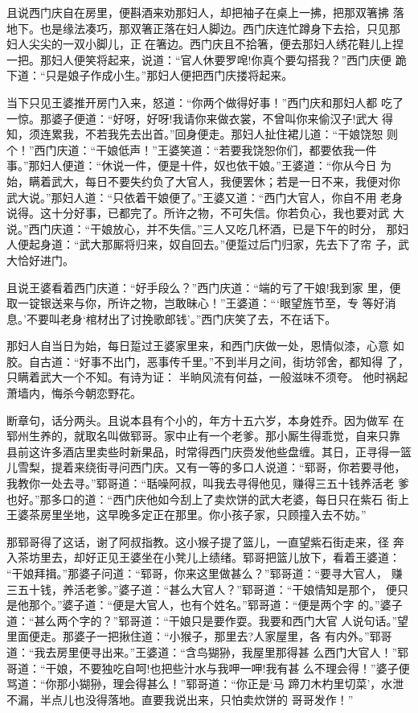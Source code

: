 且说西门庆自在房里，便斟酒来劝那妇人，却把袖子在桌上一拂，把那双箸拂
落地下。也是缘法凑巧，那双箸正落在妇人脚边。西门庆连忙蹲身下去拾，只见那
妇人尖尖的一双小脚儿，正在箸边。西门庆且不拾箸，便去那妇人绣花鞋儿上捏
一把。那妇人便笑将起来，说道：“官人休要罗唣!你真个要勾搭我？”西门庆便
跪下道：“只是娘子作成小生。”那妇人便把西门庆搂将起来。

当下只见王婆推开房门入来，怒道：“你两个做得好事！”西门庆和那妇人都
吃了一惊。那婆子便道：“好呀，好呀!我请你来做衣裳，不曾叫你来偷汉子!武大
得知，须连累我，不若我先去出首。”回身便走。那妇人扯住裙儿道：“干娘饶恕
则个！”西门庆道：“干娘低声！”王婆笑道：“若要我饶恕你们，都要依我一件
事。”那妇人便道：“休说一件，便是十件，奴也依干娘。”王婆道：“你从今日
为始，瞒着武大，每日不要失约负了大官人，我便罢休；若是一日不来，我便对你
武大说。”那妇人道：“只依着干娘便了。”王婆又道：“西门大官人，你自不用
老身说得。这十分好事，已都完了。所许之物，不可失信。你若负心，我也要对武
大说。”西门庆道：“干娘放心，并不失信。”三人又吃几杯酒，已是下午的时分，
那妇人便起身道：“武大那厮将归来，奴自回去。”便踅过后门归家，先去下了帘
子，武大恰好进门。

且说王婆看着西门庆道：“好手段么？”西门庆道：“端的亏了干娘!我到家
里，便取一锭银送来与你，所许之物，岂敢昧心！”王婆道：“‘眼望旌节至，专
等好消息。’不要叫老身‘棺材出了讨挽歌郎钱’。”西门庆笑了去，不在话下。

那妇人自当日为始，每日踅过王婆家里来，和西门庆做一处，恩情似漆，心意
如胶。自古道：“好事不出门，恶事传千里。”不到半月之间，街坊邻舍，都知得
了，只瞒着武大一个不知。有诗为证：
半晌风流有何益，一般滋味不须夸。
他时祸起萧墙内，悔杀今朝恋野花。

断章句，话分两头。且说本县有个小的，年方十五六岁，本身姓乔。因为做军
在郓州生养的，就取名叫做郓哥。家中止有一个老爹。那小厮生得乖觉，自来只靠
县前这许多酒店里卖些时新果品，时常得西门庆赍发他些盘缠。其日，正寻得一篮
儿雪梨，提着来绕街寻问西门庆。又有一等的多口人说道：“郓哥，你若要寻他，
我教你一处去寻。”郓哥道：“聒噪阿叔，叫我去寻得他见，赚得三五十钱养活老
爹也好。”那多口的道：“西门庆他如今刮上了卖炊饼的武大老婆，每日只在紫石
街上王婆茶房里坐地，这早晚多定正在那里。你小孩子家，只顾撞入去不妨。”

那郓哥得了这话，谢了阿叔指教。这小猴子提了篮儿，一直望紫石街走来，径
奔入茶坊里去，却好正见王婆坐在小凳儿上绩绪。郓哥把篮儿放下，看着王婆道：
“干娘拜揖。”那婆子问道：“郓哥，你来这里做甚么？”郓哥道：“要寻大官人，
赚三五十钱，养活老爹。”婆子道：“甚么大官人？”郓哥道：“干娘情知是那个，
便只是他那个。”婆子道：“便是大官人，也有个姓名。”郓哥道：“便是两个字
的。”婆子道：“甚么两个字的？”郓哥道：“干娘只是要作耍。我要和西门大官
人说句话。”望里面便走。那婆子一把揪住道：“小猴子，那里去?人家屋里，各
有内外。”郓哥道：“我去房里便寻出来。”王婆道：“含鸟猢狲，我屋里那得甚
么西门大官人！”郓哥道：“干娘，不要独吃自呵!也把些汁水与我呷一呷!我有甚
么不理会得！”婆子便骂道：“你那小猢狲，理会得甚么！”郓哥道：“你正是‘马
蹄刀木杓里切菜’，水泄不漏，半点儿也没得落地。直要我说出来，只怕卖炊饼的
哥哥发作！”

